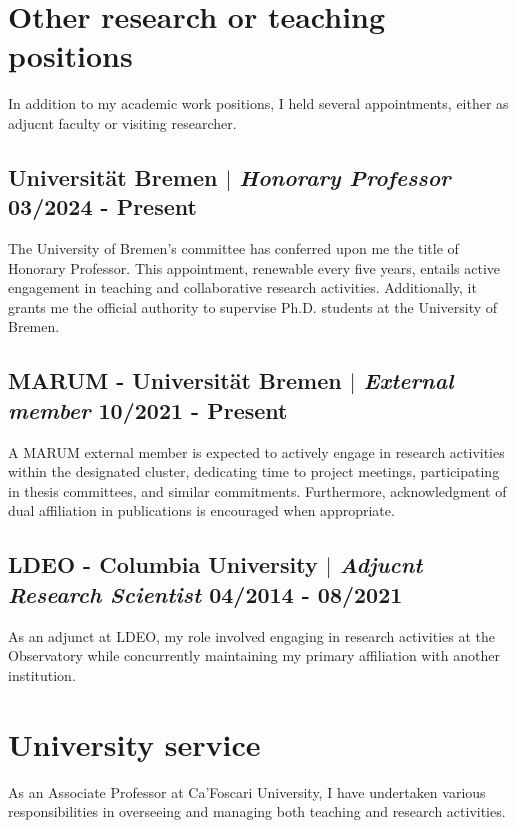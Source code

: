 \documentclass[11pt]{article}
\begin{document}
\section{Other research or teaching positions}
{\normalfont In addition to my academic work positions, I held several appointments, either as adjucnt faculty or visiting researcher.}\\
\bigskip
\subsection{Universität Bremen  $|$ {\normalfont\textit{Honorary Professor}} \hfill 03/2024 - Present}
{\footnotesize The University of Bremen's committee has conferred upon me the title of Honorary Professor. This appointment, renewable every five years, entails active engagement in teaching and collaborative research activities. Additionally, it grants me the official authority to supervise Ph.D. students at the University of Bremen.}
\bigskip

\subsection{MARUM - Universität Bremen  $|$ {\normalfont\textit{External member}} \hfill 10/2021 - Present}
{\footnotesize A MARUM external member is expected to actively engage in research activities within the designated cluster, dedicating time to project meetings, participating in thesis committees, and similar commitments. Furthermore, acknowledgment of dual affiliation in publications is encouraged when appropriate.}
\bigskip

\subsection{LDEO - Columbia University  $|$ {\normalfont\textit{Adjucnt Research Scientist}} \hfill 04/2014 - 08/2021}
{\footnotesize As an adjunct at LDEO, my role involved engaging in research activities at the Observatory while concurrently maintaining my primary affiliation with another institution.}
\bigskip


\section{University service}
{\normalfont As an Associate Professor at Ca'Foscari University, I have undertaken various responsibilities in overseeing and managing both teaching and research activities.}\\
\bigskip
\end{document}

